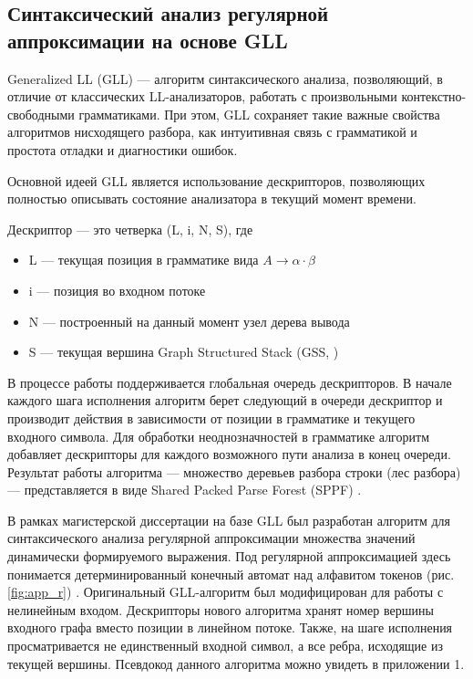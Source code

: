 \subsection{Синтаксический анализ регулярной аппроксимации на основе GLL}

Generalized LL (GLL) \cite{gll} --- алгоритм синтаксического анализа, позволяющий, в отличие от классических LL-анализаторов, работать с произвольными контекстно-свободными грамматиками. 
При этом, GLL сохраняет такие важные свойства алгоритмов нисходящего разбора, как интуитивная связь с грамматикой и простота отладки и диагностики ошибок.

Основной идеей GLL является использование дескрипторов, позволяющих полностью описывать состояние анализатора в текущий момент времени.

\begin{definition}
	Дескриптор --- это четверка (L, i, N, S), где
	\begin{itemize}
		\setlength\itemsep{0em}
		\item L --- текущая позиция в грамматике вида $A \rightarrow \alpha \cdot \beta$
		\item i --- позиция во входном потоке
		\item N --- построенный на данный момент узел дерева вывода
		\item S --- текущая вершина Graph Structured Stack (GSS, \cite{tomita})  
	\end{itemize}
\end{definition}  

В процессе работы поддерживается глобальная очередь дескрипторов. В начале каждого шага исполнения алгоритм берет следующий в очереди дескриптор и производит действия в зависимости от позиции в грамматике и текущего входного символа. 
Для обработки неоднозначностей в грамматике алгоритм добавляет дескрипторы для каждого возможного пути анализа в конец очереди. Результат работы алгоритма ---  множество деревьев разбора строки (лес разбора) --- представляется в виде Shared Packed Parse Forest (SPPF) \cite{sppf}.

В рамках магистерской диссертации \cite{gll_reg} на базе GLL был разработан алгоритм для синтаксического анализа регулярной аппроксимации множества значений динамически формируемого выражения. 
Под регулярной аппроксимацией здесь понимается детерминированный конечный автомат над алфавитом токенов \cite{smthn} (рис. \ref{fig:app_r}) . Оригинальный GLL-алгоритм был модифицирован для работы с нелинейным входом. 
Дескрипторы нового алгоритма хранят номер вершины входного графа вместо позиции в линейном потоке. Также, на шаге исполнения просматривается не единственный входной символ, а все ребра, исходящие из текущей вершины. Псевдокод данного алгоритма можно увидеть в приложении 1.

